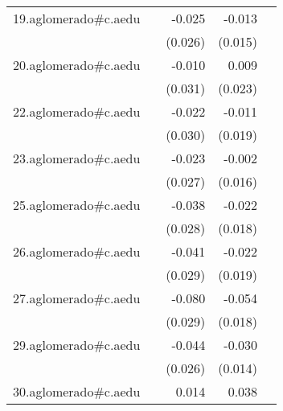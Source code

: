 {\begin{longtable}{l*{4}{D{.}{.}{-1}}}
\addlinespace
19.aglomerado#c.aedu&                     &      -0.025         &      -0.013         &                     \\
            &                     &     (0.026)         &     (0.015)         &                     \\
\addlinespace
20.aglomerado#c.aedu&                     &      -0.010         &       0.009         &                     \\
            &                     &     (0.031)         &     (0.023)         &                     \\
\addlinespace
22.aglomerado#c.aedu&                     &      -0.022         &      -0.011         &                     \\
            &                     &     (0.030)         &     (0.019)         &                     \\
\addlinespace
23.aglomerado#c.aedu&                     &      -0.023         &      -0.002         &                     \\
            &                     &     (0.027)         &     (0.016)         &                     \\
\addlinespace
25.aglomerado#c.aedu&                     &      -0.038         &      -0.022         &                     \\
            &                     &     (0.028)         &     (0.018)         &                     \\
\addlinespace
26.aglomerado#c.aedu&                     &      -0.041         &      -0.022         &                     \\
            &                     &     (0.029)         &     (0.019)         &                     \\
\addlinespace
27.aglomerado#c.aedu&                     &      -0.080\sym{**} &      -0.054\sym{**} &                     \\
            &                     &     (0.029)         &     (0.018)         &                     \\
\addlinespace
29.aglomerado#c.aedu&                     &      -0.044         &      -0.030\sym{*}  &                     \\
            &                     &     (0.026)         &     (0.014)         &                     \\
\addlinespace
30.aglomerado#c.aedu&                     &       0.014         &       0.038\sym{*}  &                     \\

\end{longtable}}
